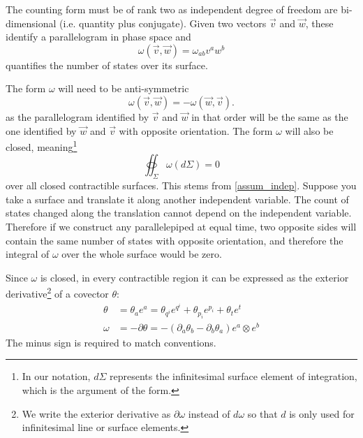 \documentclass[10pt,twocolumn, nofootinbib]{revtex4-2}
\begin{document}
The counting form must be of rank two as independent degree of freedom are bi-dimensional (i.e. quantity plus conjugate). Given two vectors $\vec{v}$ and $\vec{w}$, these identify a parallelogram in phase space and 
\begin{equation}\label{mdof_form_applied}
	\omega(\vec{v}, \vec{w}) = \omega_{ab} v^a w^b
\end{equation}
quantifies the number of states over its surface.

The form $\omega$ will need to be anti-symmetric
\begin{equation}\label{mdof_form_antisymm}
	\omega(\vec{v}, \vec{w}) = - \omega(\vec{w}, \vec{v}).
\end{equation}
as the parallelogram identified by $\vec{v}$ and $\vec{w}$ in that order will be the same as the one identified by $\vec{w}$ and $\vec{v}$ with opposite orientation. The form $\omega$ will also be closed, meaning\footnote{In our notation, $d\Sigma$ represents the infinitesimal surface element of integration, which is the argument of the form.}
\begin{equation}\label{mdof_closed_form}
	\oiint_\Sigma \omega(d\Sigma) = 0
\end{equation}
over all closed contractible surfaces. This stems from \ref{assum_indep}. Suppose you take a surface and translate it along another independent variable. The count of states changed along the translation cannot depend on the independent variable. Therefore if we construct any parallelepiped at equal time, two opposite sides will contain the same number of states with opposite orientation, and therefore the integral of $\omega$ over the whole surface would be zero.

Since $\omega$ is closed, in every contractible region it can be expressed as the exterior derivative\footnote{We write the exterior derivative as $\partial \omega$ instead of $d \omega$ so that $d$ is only used for infinitesimal line or surface elements.} of a covector $\theta$:
\begin{equation}\label{mdof_form_potential}
	\begin{aligned}
		\theta &= \theta_a e^a = \theta_{q^i} e^{q^i} + \theta_{p_i} e^{p_i} + \theta_t e^t \\
		\omega &= - \partial \theta = - \left( \partial_a \theta_b - \partial_b \theta_a \right) e^a \otimes e^b
	\end{aligned}
\end{equation}
The minus sign is required to match conventions.
\end{document}
